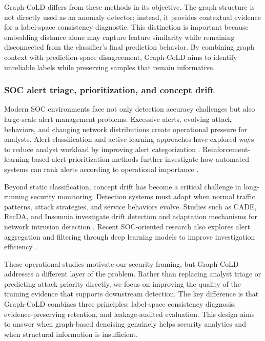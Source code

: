 \documentclass[preprint,3p,times]{elsarticle}
\begin{document}
Graph-CoLD differs from these methods in its objective. The graph structure is
not directly used as an anomaly detector; instead, it provides contextual
evidence for a label-space consistency diagnostic. This distinction is
important because embedding distance alone may capture feature similarity while
remaining disconnected from the classifier's final prediction behavior. By
combining graph context with prediction-space disagreement, Graph-CoLD aims to
identify unreliable labels while preserving samples that remain informative.

\subsubsection*{SOC alert triage, prioritization, and concept drift}

Modern SOC environments face not only detection accuracy challenges but also
large-scale alert management problems. Excessive alerts, evolving attack
behaviors, and changing network distributions create operational pressure for
analysts. Alert classification and active-learning approaches have explored
ways to reduce analyst workload by improving alert categorization
\cite{vaarandi2024nids}. Reinforcement-learning-based alert prioritization
methods further investigate how automated systems can rank alerts according to
operational importance \cite{chavali2024rlalert}.

Beyond static classification, concept drift has become a critical challenge in
long-running security monitoring. Detection systems must adapt when normal
traffic patterns, attack strategies, and service behaviors evolve. Studies such
as CADE, RecDA, and Insomnia investigate drift detection and adaptation
mechanisms for network intrusion detection
\cite{yang2021cade,yang2024recda,andresini2021insomnia}. Recent SOC-oriented
research also explores alert aggregation and filtering through deep learning
models to improve investigation efficiency
\cite{liu2025deepdrac,shon2023semisup,wang2024alertagg}.

These operational studies motivate our security framing, but Graph-CoLD
addresses a different layer of the problem. Rather than replacing analyst
triage or predicting attack priority directly, we focus on improving the
quality of the training evidence that supports downstream detection. The key
difference is that Graph-CoLD combines three principles: label-space
consistency diagnosis, evidence-preserving retention, and leakage-audited
evaluation. This design aims to answer when graph-based denoising genuinely
helps security analytics and when structural information is insufficient.
\end{document}

